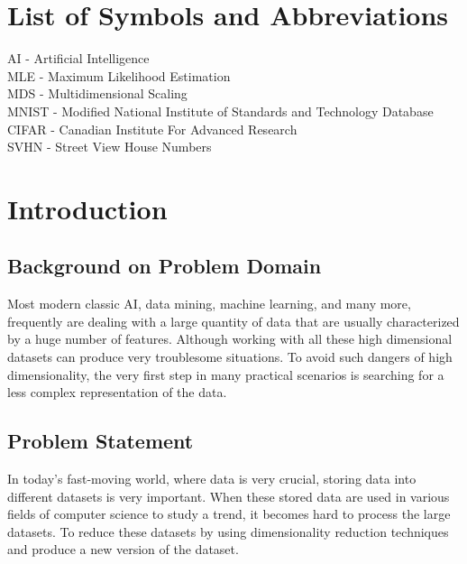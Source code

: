 \documentclass[12pt,letterpaper]{report}
\begin{document}
\setcounter{page}{0}

\tableofcontents

\chapter*{List of Symbols and Abbreviations}

AI  \;-\; Artificial Intelligence\\
MLE \;-\;  Maximum Likelihood Estimation\\
MDS \;-\; Multidimensional Scaling\\
MNIST \;-\; Modified National Institute of Standards and Technology Database\\
CIFAR \;-\; Canadian Institute For Advanced Research\\
SVHN \;-\; Street View House Numbers


\listoffigures{}


\chapter{Introduction}

\section{Background on Problem Domain}
Most modern classic AI, data mining, machine learning, and many more, frequently are dealing with a large quantity of data that are usually characterized by a huge number of features. Although working with all these high dimensional datasets can produce very troublesome situations.  To avoid such dangers of high dimensionality, the very first step in many practical scenarios is searching for a less complex representation of the data.

\section{Problem Statement}
In today's fast-moving world, where data is very crucial, storing data into different datasets is very important. When these stored data are used in various fields of computer science to study a trend, it becomes hard to process the large datasets. To reduce these datasets by using dimensionality reduction techniques and produce a new version of the dataset.
\end{document}

